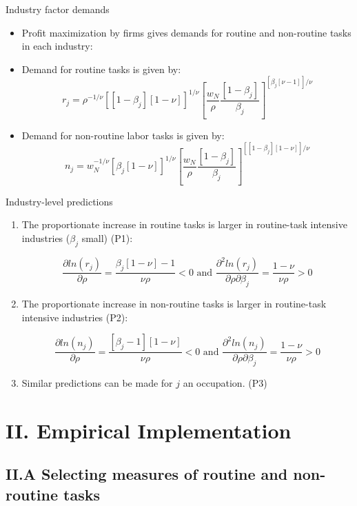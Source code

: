 \documentclass[notes=show]{beamer}
\begin{document}
\begin{frame}{Industry factor demands}
\begin{itemize}
\item Profit maximization by firms gives demands for routine and non-routine tasks in each industry: \medskip
\item Demand for routine tasks is given by:
\[
r_{j}= \rho^{-1/ \nu} [[1- \beta_{j}][1- \nu]]^{1/ \nu} \left[ \frac{w_{N}}{\rho} \frac{[1- \beta_{j}]}{\beta_{j}} \right]^{[\beta_{j}[ \nu - 1]] / \nu} \tag{11a}  \label{eq11}
\]
\item Demand for non-routine labor tasks is given by:
\[
n_{j}=w_{N}^{-1/ \nu} [ \beta_{j}[1- \nu]]^{1/ \nu} \left[ \frac{w_{N}}{\rho} \frac{[1- \beta_{j}]}{\beta_{j}} \right]^{[[1- \beta_{j}][1 - \nu]] / \nu} \tag{11b}  \label{eq11}
\]
\end{itemize}
\end{frame}

\begin{frame}{Industry-level predictions}
\begin{enumerate}
\item The proportionate increase in routine tasks is larger in routine-task intensive industries ($ \beta_{j} $ small) (P1):
\begin{tcolorbox}
\[
\frac{ \partial ln(r_{j})}{ \partial \rho} = \frac{ \beta_{j}[1 - \nu] - 1}{\nu \rho} <0 \text{ and } \frac{\partial ^2 ln(r_{j})}{\partial \rho \partial \beta_{j}} = \frac{1- \nu}{\nu \rho} >0
\]
\end{tcolorbox}
\item The proportionate increase in non-routine tasks is larger in routine-task intensive industries (P2):
\begin{tcolorbox}
\[
\frac{\partial ln(n_{j})}{\partial \rho} = \frac{[\beta_{j}-1][1 - \nu]}{\nu \rho} <0 \text{ and } \frac{\partial ^2 ln(n_{j})}{\partial \rho \partial \beta_{j}} = \frac{1 - \nu}{\nu \rho} >0
\]
\end{tcolorbox}
\item Similar predictions can be made for $j$ an occupation. (P3)
\end{enumerate}
\end{frame}

\section{II. Empirical Implementation}

\subsection{II.A Selecting measures of routine and non-routine tasks}
\end{document}
